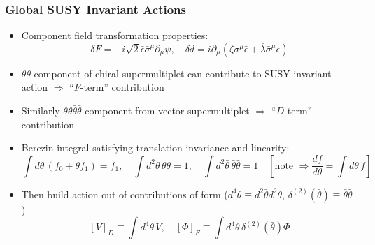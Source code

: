 \documentclass[10pt,aspectratio=169]{beamer}
\begin{document}
\begin{frame}
  \frametitle{Global SUSY Invariant Actions}
  \begin{itemize}\itemsep1em
  \item Component field transformation properties:
    \begin{equation*}
      \delta F = -i \sqrt{2} \bar{\epsilon} \bar{\sigma}^\mu \partial_\mu \psi ,
      \quad \delta d = i \partial_\mu \left ( \zeta \sigma^\mu \bar{\epsilon}
      + \bar{\lambda} \bar{\sigma}^\mu \epsilon \right )
    \end{equation*}
  \item $\theta \theta$ component of chiral supermultiplet
    can contribute to SUSY invariant action $\Rightarrow$ {\color{blue}
      ``$F$-term'' contribution}
  \item Similarly $\theta\theta\bar{\theta}\bar{\theta}$ component
    from vector supermultiplet $\Rightarrow$ {\color{blue} ``$D$-term''
      contribution}
  \item Berezin integral satisfying translation invariance and linearity:
    \begin{equation*}
      \int d\theta \, (f_0 + \theta f_1) = f_1 , \quad
      \int d^2 \theta \, \theta \theta = 1 , \quad
      \int d^2 \bar{\theta} \, \bar{\theta} \bar{\theta} = 1 \quad
      \left [ \text{note } \Rightarrow \frac{d f}{d\theta} = \int d\theta\,
        f \right ]
    \end{equation*}
  \item Then build action out of contributions of form
    ($d^4\theta \equiv d^2 \bar{\theta} d^2 \theta$,
    $\delta^{(2)}(\bar{\theta}) \equiv \bar{\theta} \bar{\theta}$ )
    \begin{equation*}
      \left [ V \right ]_D \equiv \int d^4\theta \, V , \quad
      \left [ \Phi \right ]_F \equiv \int d^4 \theta \, \delta^{(2)}(
      \bar{\theta}) \Phi
    \end{equation*}
  \end{itemize}
\end{frame}
\end{document}
